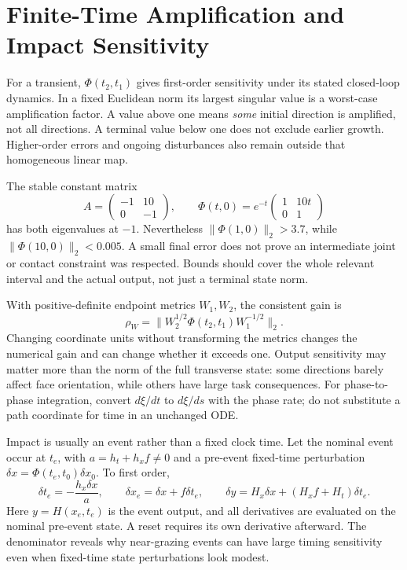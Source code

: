 \documentclass[12pt, openany]{book}
\theoremstyle{plain}
\begin{document}
\section{Finite-Time Amplification and Impact Sensitivity}

For a transient, $\Phi(t_2,t_1)$ gives first-order sensitivity under its stated
closed-loop dynamics. In a fixed Euclidean norm its largest singular value
is a worst-case amplification factor. A value above one means \emph{some}
initial direction is amplified, not all directions. A terminal value below
one does not exclude earlier growth. Higher-order errors and ongoing
disturbances also remain outside that homogeneous linear map.

The stable constant matrix
\begin{equation}\label{eq:orbital_transient_growth}
 A=\begin{pmatrix}-1&10\\0&-1\end{pmatrix},\qquad
 \Phi(t,0)=e^{-t}\begin{pmatrix}1&10t\\0&1\end{pmatrix}
\end{equation}
has both eigenvalues at $-1$. Nevertheless $\|\Phi(1,0)\|_2>3.7$, while
$\|\Phi(10,0)\|_2<0.005$. A small final error does not prove an intermediate
joint or contact constraint was respected. Bounds should cover the whole
relevant interval and the actual output, not just a terminal state norm.

With positive-definite endpoint metrics $W_1,W_2$, the consistent gain is
\begin{equation}\label{eq:amplification}
 \rho_W=\|W_2^{1/2}\Phi(t_2,t_1)W_1^{-1/2}\|_2.
\end{equation}
Changing coordinate units without transforming the metrics changes the
numerical gain and can change whether it exceeds one. Output sensitivity
may matter more than the norm of the full transverse state: some directions
barely affect face orientation, while others have large task consequences.
For phase-to-phase integration, convert $d\xi/dt$ to $d\xi/ds$ with the
phase rate; do not substitute a path coordinate for time in an unchanged ODE.

Impact is usually an event rather than a fixed clock time. Let the nominal
event occur at $t_e$, with $a=h_t+h_xf\ne0$ and a pre-event fixed-time
perturbation $\delta x=\Phi(t_e,t_0)\delta x_0$. To first order,
\begin{equation}\label{eq:orbital_event_sensitivity}
 \delta t_e=-\frac{h_x\delta x}{a},\qquad
 \delta x_e=\delta x+f\delta t_e,\qquad
 \delta y=H_x\delta x+(H_xf+H_t)\delta t_e.
\end{equation}
Here $y=H(x_e,t_e)$ is the event output, and all derivatives are evaluated
on the nominal pre-event state. A reset requires its own derivative afterward.
The denominator reveals why near-grazing events can have large timing
sensitivity even when fixed-time state perturbations look modest.
\end{document}
